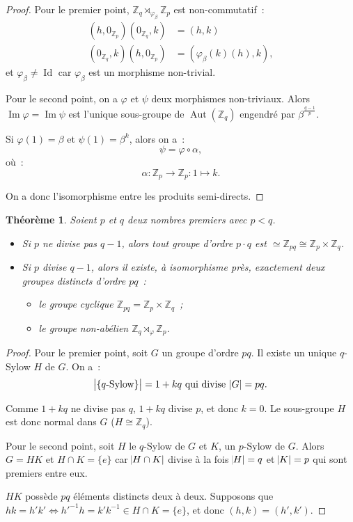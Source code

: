 \documentclass{article}
\newtheorem{thm}{Théorème}[section]
\theoremstyle{definition}
\theoremstyle{remark}
\DeclareMathOperator{\Id}{Id}
\DeclareMathOperator{\Imf}{Im}
\DeclareMathOperator{\Aut}{Aut}
\newcommand{\Z}{\mathbb Z}
\newcommand{\simeqq}{\cong}
\begin{document}
		\begin{proof} Pour le premier point, $\Z_q \rtimes_{\varphi_\beta} \Z_p$ est non-commutatif~:
		\begin{align*}
			(h, 0_{\Z_p})(0_{\Z_q}, k) &= (h, k) \\
			(0_{\Z_q}, k)(h, 0_{\Z_p}) &= (\varphi_\beta(k)(h), k),
		\end{align*}
		et $\varphi_\beta \neq \Id$ car $\varphi_\beta$ est un morphisme non-trivial.

		Pour le second point, on a $\varphi$ et $\psi$ deux morphismes non-triviaux. Alors $\Imf \varphi = \Imf \psi$ est l'unique sous-groupe de $\Aut(\Z_q)$
		engendré par $\beta^{\frac {q-1}p}$.

		Si $\varphi(1) = \beta$ et $\psi(1) = \beta^k$, alors on a~:
		\[\psi = \varphi \circ \alpha,\]
		où~:
		\[\alpha : \Z_p \to \Z_p : 1 \mapsto k.\]

		On a donc l'isomorphisme entre les produits semi-directs.
		\end{proof}

		\begin{thm} Soient $p$ et $q$ deux nombres premiers avec $p < q$.
		\begin{itemize}
			\item Si $p$ ne divise pas $q-1$, alors tout groupe d'ordre $p \cdot q$ est $\simeq \Z_{pq} \simeqq \Z_p \times \Z_q$.

			\item Si $p$ divise $q-1$, alors il existe, à isomorphisme près, exactement deux groupes distincts d'ordre $pq$~:
			\begin{itemize}
				\item le groupe cyclique $\Z_{pq} = \Z_p \times \Z_q$~;
				\item le groupe non-abélien $\Z_q \rtimes_\varphi \Z_p$.
			\end{itemize}
		\end{itemize}
		\end{thm}

		\begin{proof} Pour le premier point, soit $G$ un groupe d'ordre $pq$. Il existe un unique $q$-Sylow $H$ de $G$. On a~:
		\[\abs {\{q\text{-Sylow}\}} = 1 + kq \text { qui divise } \abs G = pq.\]

		Comme $1+kq$ ne divise pas $q$, $1 + kq$ divise $p$, et donc $k = 0$. Le sous-groupe $H$ est donc normal dans $G$ ($H \simeqq \Z_q$).

		Pour le second point, soit $H$ le $q$-Sylow de $G$ et $K$, un $p$-Sylow de $G$. Alors $G = HK$ et $H \cap K = \{e\}$ car $\abs {H \cap K}$ divise à la
		fois $\abs H = q$ et $\abs K = p$ qui sont premiers entre eux.

		$HK$ possède $pq$ éléments distincts deux à deux. Supposons que $hk = h'k' \iff h'^{-1}h = k'k^{-1} \in H \cap K = \{e\}$, et donc $(h, k) = (h', k')$.
		\end{proof}
\end{document}
